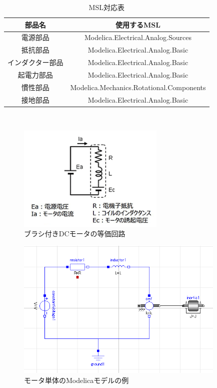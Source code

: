 \begin{table}[t]
	\centering
	\caption{MSL対応表}
	\begin{tabular}{|c|c|} \hline
	  部品名 & 使用するMSL \\ \hline \hline
	  電源部品 & Modelica.Electrical.Analog.Sources \\ \hline
	  抵抗部品 & Modelica.Electrical.Analog.Basic \\ \hline
	  インダクター部品 & Modelica.Electrical.Analog.Basic \\ \hline
	  起電力部品 & Modelica.Electrical.Analog.Basic \\ \hline
	  慣性部品 & Modelica.Mechanics.Rotational.Components \\ \hline
	  接地部品 & Modelica.Electrical.Analog.Basic \\ \hline
	\end{tabular}
	\label{tab:MSL}
  \end{table}
　
\begin{figure}[t]
	\centering
	\includegraphics[width=7cm]{./Image/touka.png}
	\caption{ブラシ付きDCモータの等価回路}
	\label{fig:touka}
  \end{figure}

\begin{figure}[t]
  \centering
  \includegraphics[width=10cm]{./Image/tantai_model.png}
  \caption{モータ単体のModelicaモデルの例}
  \label{fig:tantai_model}
\end{figure}

